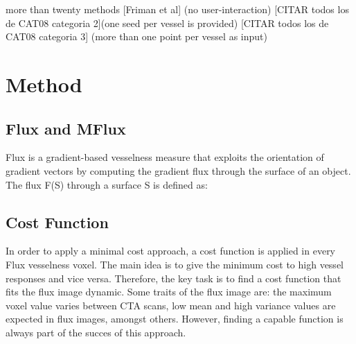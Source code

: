 more than twenty methods 
[Friman et al] (no user-interaction)
 [CITAR todos los de CAT08 categoria 2](one seed per vessel is provided)
[CITAR todos los de CAT08 categoria 3]  (more than one point per vessel as input)

\section{Method}

\subsection{Flux and MFlux}

Flux is a gradient-based vesselness measure that exploits the orientation of gradient vectors by computing the gradient flux through the surface of an object. The flux F(S) through a surface S is defined as:



\subsection{Cost Function}

In order to apply a minimal cost approach, a cost function is applied in every Flux vesselness voxel. The main idea is to give the minimum cost to high vessel responses and vice versa. Therefore, the key task is to find a cost function that fits the flux image dynamic. Some traits of the flux image are: the maximum voxel value varies between CTA scans, low mean and high variance values are expected in flux images, amongst others. However, finding a capable function is always part of the succes of this approach.

